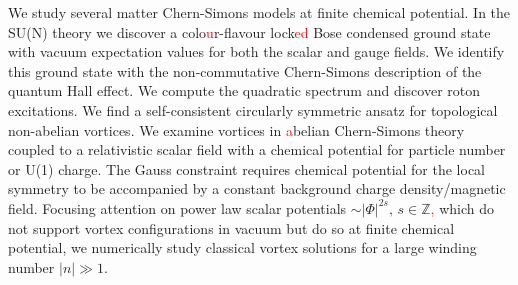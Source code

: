 


\begin{abstracts}        %

\begin{singlespace}
    We study several matter Chern-Simons models at finite chemical potential. In the SU(N) theory we discover a colo\textcolor{red}{u}r-flavour lock\textcolor{red}{ed} Bose condensed ground state with vacuum expectation values for both the scalar and gauge fields. We identify this ground state with the non-commutative Chern-Simons description of the quantum Hall effect. We compute the quadratic spectrum and discover roton excitations. We find a self-consistent circularly symmetric ansatz for topological non-abelian vortices. We examine vortices in \textcolor{red}{a}belian Chern-Simons theory coupled to a relativistic scalar field with a chemical potential for particle number or U(1) charge. The Gauss constraint requires chemical potential for the local symmetry to be accompanied by a constant background charge density/magnetic field. Focusing attention on power law scalar potentials $∼ |\Phi|^{2s}, \, s\in \mathbb{Z}$\textcolor{red}{,} which do not support vortex configurations in vacuum but do so at finite chemical potential, we numerically study classical vortex solutions for a large winding number $|n|\gg 1$.
\end{singlespace}

\end{abstracts}


